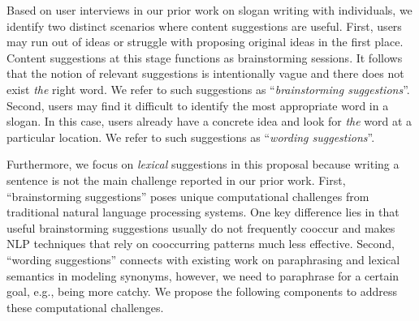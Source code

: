 Based on user interviews in our prior work on slogan writing with individuals, we identify two distinct scenarios where content suggestions are useful.
First, users may run out of ideas or struggle with proposing original ideas in the first place.
Content suggestions at this stage functions as brainstorming sessions.
It follows that the notion of relevant suggestions is intentionally vague and there does not exist {\em the} right word.
We refer to such suggestions as ``{\em brainstorming suggestions}''.
Second, users may find it difficult to identify the most appropriate word in a slogan.
In this case, users already have a concrete idea and look for {\em the} word at a particular location.
We refer to such suggestions as ``{\em wording suggestions}''.

Furthermore, we focus on {\em lexical} suggestions in this proposal because writing a sentence is not the main challenge reported in our prior work.
First, ``brainstorming suggestions'' poses unique computational challenges from traditional natural language processing systems.
One key difference lies in that useful brainstorming suggestions usually do not frequently cooccur and makes NLP techniques that rely on cooccurring patterns much less effective.
Second, ``wording suggestions'' connects with existing work on paraphrasing and lexical semantics in modeling synonyms, however, we need to paraphrase for a certain goal, e.g., being more catchy.
We propose the following 
components to address these computational challenges.

